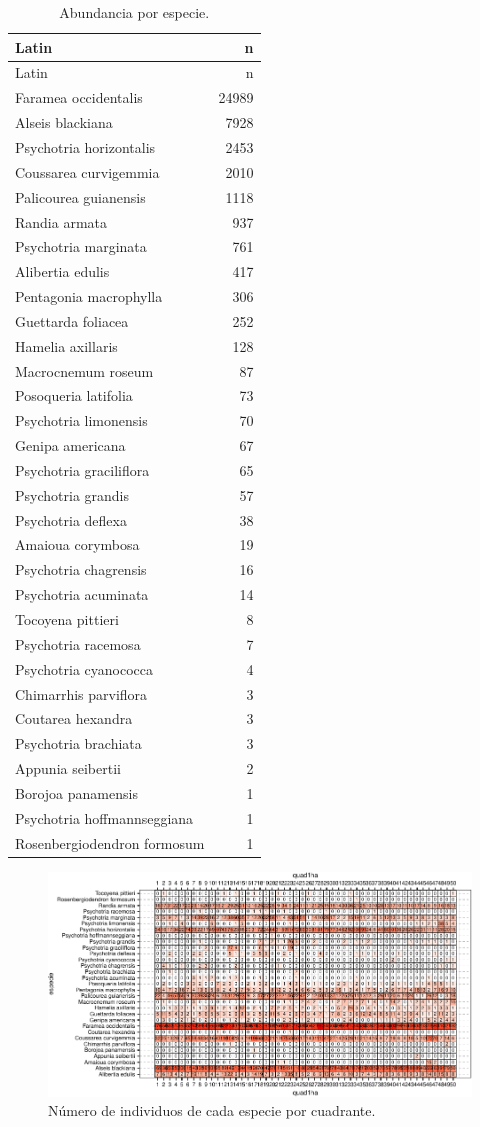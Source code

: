 \documentclass[11pt,]{article}
\begin{document}
\begin{longtable}[]{@{}lr@{}}
\caption{\label{tab:abun_sp}Abundancia por especie.}\tabularnewline
\toprule
Latin & n\tabularnewline
\midrule
\endfirsthead
\toprule
Latin & n\tabularnewline
\midrule
\endhead
Faramea occidentalis & 24989\tabularnewline
Alseis blackiana & 7928\tabularnewline
Psychotria horizontalis & 2453\tabularnewline
Coussarea curvigemmia & 2010\tabularnewline
Palicourea guianensis & 1118\tabularnewline
Randia armata & 937\tabularnewline
Psychotria marginata & 761\tabularnewline
Alibertia edulis & 417\tabularnewline
Pentagonia macrophylla & 306\tabularnewline
Guettarda foliacea & 252\tabularnewline
Hamelia axillaris & 128\tabularnewline
Macrocnemum roseum & 87\tabularnewline
Posoqueria latifolia & 73\tabularnewline
Psychotria limonensis & 70\tabularnewline
Genipa americana & 67\tabularnewline
Psychotria graciliflora & 65\tabularnewline
Psychotria grandis & 57\tabularnewline
Psychotria deflexa & 38\tabularnewline
Amaioua corymbosa & 19\tabularnewline
Psychotria chagrensis & 16\tabularnewline
Psychotria acuminata & 14\tabularnewline
Tocoyena pittieri & 8\tabularnewline
Psychotria racemosa & 7\tabularnewline
Psychotria cyanococca & 4\tabularnewline
Chimarrhis parviflora & 3\tabularnewline
Coutarea hexandra & 3\tabularnewline
Psychotria brachiata & 3\tabularnewline
Appunia seibertii & 2\tabularnewline
Borojoa panamensis & 1\tabularnewline
Psychotria hoffmannseggiana & 1\tabularnewline
Rosenbergiodendron formosum & 1\tabularnewline
\bottomrule
\end{longtable}

\begin{figure}
\centering
\includegraphics{manuscrito_files/figure-latex/unnamed-chunk-3-1.pdf}
\caption{\label{fig:abun_sp_q}Número de individuos de cada especie por
cuadrante.}
\end{figure}
\end{document}
